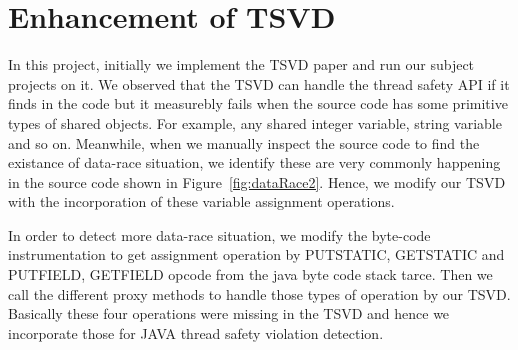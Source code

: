 \section{Enhancement of TSVD}
\label{lbl:tsvd_enhance}

In this project, initially we implement the TSVD paper \cite{} and run our
subject projects on it. We observed that the TSVD can handle the thread safety
API if it finds in the code but it measurebly fails when the source code has
some primitive types of shared objects. For example, any shared integer
variable, string variable and so on. Meanwhile, when we manually inspect the
source code to find the existance of data-race situation, we identify these are
very commonly happening in the source code shown in Figure~\ref{fig:dataRace2}. Hence, we modify our TSVD with the
incorporation of these variable assignment operations. 

In order to detect more data-race situation, we modify the byte-code
instrumentation to get assignment operation by PUTSTATIC, GETSTATIC and
PUTFIELD, GETFIELD opcode from the java byte code stack tarce. Then we call the
different proxy methods to handle those types of operation by our TSVD. Basically these four operations were missing in the TSVD and hence we incorporate those for JAVA thread safety violation detection. 









